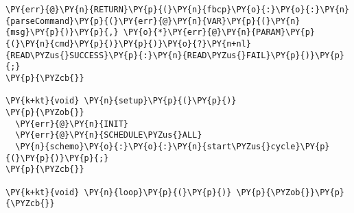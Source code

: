 \begin{Verbatim}[commandchars=\\\{\}]
  \PY{err}{@}\PY{n}{RETURN}\PY{p}{(}\PY{n}{fbcp}\PY{o}{:}\PY{o}{:}\PY{n}{parseCommand}\PY{p}{(}\PY{err}{@}\PY{n}{VAR}\PY{p}{(}\PY{n}{msg}\PY{p}{)}\PY{p}{,} \PY{o}{*}\PY{err}{@}\PY{n}{PARAM}\PY{p}{(}\PY{n}{cmd}\PY{p}{)}\PY{p}{)}\PY{o}{?}\PY{n+nl}{READ\PYZus{}SUCCESS}\PY{p}{:}\PY{n}{READ\PYZus{}FAIL}\PY{p}{)}\PY{p}{;}
\PY{p}{\PYZcb{}}

\PY{k+kt}{void} \PY{n}{setup}\PY{p}{(}\PY{p}{)}
\PY{p}{\PYZob{}}
  \PY{err}{@}\PY{n}{INIT}
  \PY{err}{@}\PY{n}{SCHEDULE\PYZus{}ALL}
  \PY{n}{schemo}\PY{o}{:}\PY{o}{:}\PY{n}{start\PYZus{}cycle}\PY{p}{(}\PY{p}{)}\PY{p}{;}
\PY{p}{\PYZcb{}}

\PY{k+kt}{void} \PY{n}{loop}\PY{p}{(}\PY{p}{)} \PY{p}{\PYZob{}}\PY{p}{\PYZcb{}}
\end{Verbatim}
